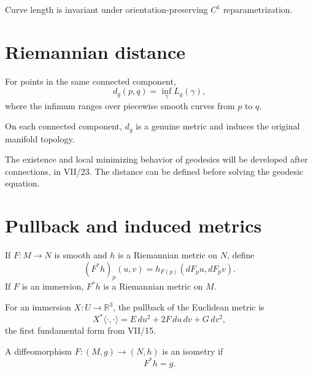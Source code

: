 \begin{proposition}\label{prop:vii20-length-invariance}
Curve length is invariant under orientation-preserving \(C^1\) reparametrization.
\end{proposition}

\section{Riemannian distance}

\begin{definition}\label{def:vii20-distance}
For points in the same connected component,
\[
d_g(p,q)=\inf_\gamma L_g(\gamma),
\]
where the infimum ranges over piecewise smooth curves from \(p\) to \(q\).
\end{definition}

\begin{theorem}\label{thm:vii20-distance-metric}
On each connected component, \(d_g\) is a genuine metric and induces the original
manifold topology.
\end{theorem}

\begin{remark}
The existence and local minimizing behavior of geodesics will be developed after
connections, in VII/23.  The distance can be defined before solving the geodesic
equation.
\end{remark}

\section{Pullback and induced metrics}

\begin{definition}\label{def:vii20-pullback}
If \(F:M\to N\) is smooth and \(h\) is a Riemannian metric on \(N\), define
\[
(F^*h)_p(u,v)=h_{F(p)}(dF_pu,dF_pv).
\]
If \(F\) is an immersion, \(F^*h\) is a Riemannian metric on \(M\).
\end{definition}

\begin{example}\label{ex:vii20-induced-surface}
For an immersion \(X:U\to\mathbb R^3\), the pullback of the Euclidean metric is
\[
X^*\langle\cdot,\cdot\rangle
=
E\,du^2+2F\,du\,dv+G\,dv^2,
\]
the first fundamental form from VII/15.
\end{example}

\begin{definition}\label{def:vii20-isometry}
A diffeomorphism \(F:(M,g)\to(N,h)\) is an isometry if
\[
F^*h=g.
\]
\end{definition}

